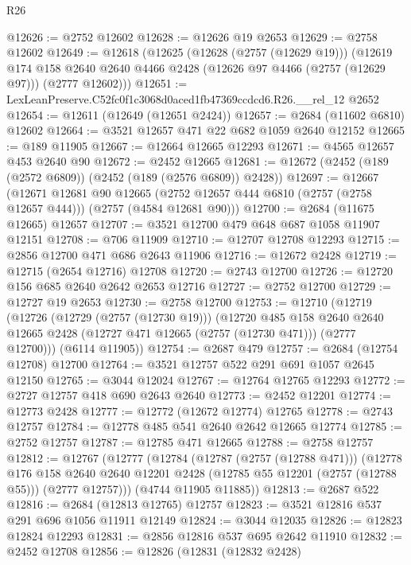 \begin{lexlean}{R26}
\begin{coremodule}
@12626 := @2752 @12602
@12628 := @12626 @19 @2653
@12629 := @2758 @12602
@12649 := @12618
    (@12625
      (@12628 (@2757 (@12629 @19)))
      (@12619
        @174
        @158
        @2640
        @2640
        @4466
        @2428
        (@12626 @97 @4466 (@2757 (@12629 @97)))
        (@2777 @12602)))
@12651 := LexLeanPreserve.C52fc0f1c3068d0aced1fb47369ccdcd6.R26.__rel_12 @2652
@12654 := @12611 (@12649 (@12651 @2424))
@12657 := @2684 (@11602 @6810) @12602
@12664 := @3521 @12657 @471 @22 @682 @1059 @2640 @12152
@12665 := @189 @11905
@12667 := @12664 @12665 @12293
@12671 := @4565 @12657 @453 @2640 @90
@12672 := @2452 @12665
@12681 := @12672 (@2452 (@189 (@2572 @6809)) (@2452 (@189 (@2576 @6809)) @2428))
@12697 := @12667
    (@12671
      @12681
      @90
      @12665
      (@2752 @12657 @444 @6810 (@2757 (@2758 @12657 @444)))
      (@2757 (@4584 @12681 @90)))
@12700 := @2684 (@11675 @12665) @12657
@12707 := @3521 @12700 @479 @648 @687 @1058 @11907 @12151
@12708 := @706 @11909
@12710 := @12707 @12708 @12293
@12715 := @2856 @12700 @471 @686 @2643 @11906
@12716 := @12672 @2428
@12719 := @12715 (@2654 @12716) @12708
@12720 := @2743 @12700
@12726 := @12720 @156 @685 @2640 @2642 @2653 @12716
@12727 := @2752 @12700
@12729 := @12727 @19 @2653
@12730 := @2758 @12700
@12753 := @12710
    (@12719
      (@12726
        (@12729 (@2757 (@12730 @19)))
        (@12720
          @485
          @158
          @2640
          @2640
          @12665
          @2428
          (@12727 @471 @12665 (@2757 (@12730 @471)))
          (@2777 @12700)))
      (@6114 @11905))
@12754 := @2687 @479
@12757 := @2684 (@12754 @12708) @12700
@12764 := @3521 @12757 @522 @291 @691 @1057 @2645 @12150
@12765 := @3044 @12024
@12767 := @12764 @12765 @12293
@12772 := @2727 @12757 @418 @690 @2643 @2640
@12773 := @2452 @12201
@12774 := @12773 @2428
@12777 := @12772 (@12672 @12774) @12765
@12778 := @2743 @12757
@12784 := @12778 @485 @541 @2640 @2642 @12665 @12774
@12785 := @2752 @12757
@12787 := @12785 @471 @12665
@12788 := @2758 @12757
@12812 := @12767
    (@12777
      (@12784
        (@12787 (@2757 (@12788 @471)))
        (@12778
          @176
          @158
          @2640
          @2640
          @12201
          @2428
          (@12785 @55 @12201 (@2757 (@12788 @55)))
          (@2777 @12757)))
      (@4744 @11905 @11885))
@12813 := @2687 @522
@12816 := @2684 (@12813 @12765) @12757
@12823 := @3521 @12816 @537 @291 @696 @1056 @11911 @12149
@12824 := @3044 @12035
@12826 := @12823 @12824 @12293
@12831 := @2856 @12816 @537 @695 @2642 @11910
@12832 := @2452 @12708
@12856 := @12826
    (@12831
      (@12832 @2428)

\end{coremodule}
\end{lexlean}
